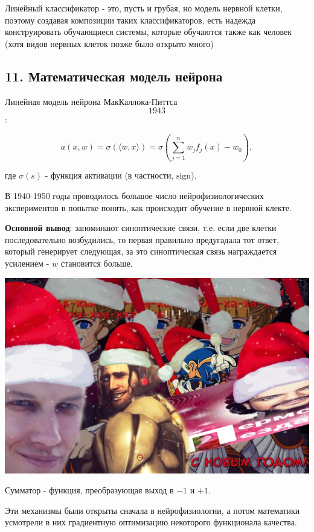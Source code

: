 Линейный классификатор - это, пусть и грубая, но модель нервной клетки,
поэтому создавая композиции таких классификаторов, есть надежда
конструировать обучающиеся системы, которые обучаются также как человек
(хотя видов нервных клеток позже было открыто много)

\subsection{11. Математическая модель нейрона}

Линейная модель нейрона МакКаллока-Питтса \[1943\]:

$$a{\left( x, w \right)} = \sigma{\left( {\langle w, x \rangle} \right)} = \sigma{\left( \sum_{j=1}^{n}{w_j f_j{\left( x \right)}} - w_0 \right)},$$

где $\sigma{\left( s \right)}$ - функция активации
(в частности, $\text{sign}$).

В 1940-1950 годы проводилось большое число нейрофизиологических
экспериментов в попытке понять, как происходит обучение в нервной клекте.

\textbf{Основной вывод}: запоминают синоптические связи, т.е. если две клетки
последовательно возбудились, то первая правильно предугадала тот ответ,
который генерирует следующая, за это синоптическая связь награждается
усилением - $w$ становится больше.

\includegraphics[scale=0.3]{figures/samplefigure.jpg}

Сумматор - функция, преобразующая выход в $-1$ и $+1$.

Эти механизмы были открыты сначала в нейрофизиологии, а потом математики
усмотрели в них градиентную оптимизацию некоторого функционала качества.

